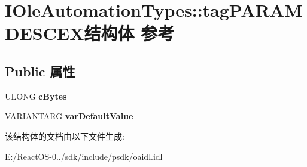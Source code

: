 \hypertarget{struct_i_ole_automation_types_1_1tag_p_a_r_a_m_d_e_s_c_e_x}{}\section{I\+Ole\+Automation\+Types\+:\+:tag\+P\+A\+R\+A\+M\+D\+E\+S\+C\+E\+X结构体 参考}
\label{struct_i_ole_automation_types_1_1tag_p_a_r_a_m_d_e_s_c_e_x}
\subsection*{Public 属性}
\begin{DoxyCompactItemize}
\item 
\mbox{\label{struct_i_ole_automation_types_1_1tag_p_a_r_a_m_d_e_s_c_e_x_a5420105ae21927b2fa78558729e1046d}} 
U\+L\+O\+NG {\bfseries c\+Bytes}
\item 
\mbox{\label{struct_i_ole_automation_types_1_1tag_p_a_r_a_m_d_e_s_c_e_x_a98c5b9ab8f5f66b84669aee8283b2775}} 
\hyperlink{structtag_v_a_r_i_a_n_t}{V\+A\+R\+I\+A\+N\+T\+A\+RG} {\bfseries var\+Default\+Value}
\end{DoxyCompactItemize}


该结构体的文档由以下文件生成\+:\begin{DoxyCompactItemize}
\item 
E\+:/\+React\+O\+S-\/0../sdk/include/psdk/oaidl.\+idl\end{DoxyCompactItemize}
